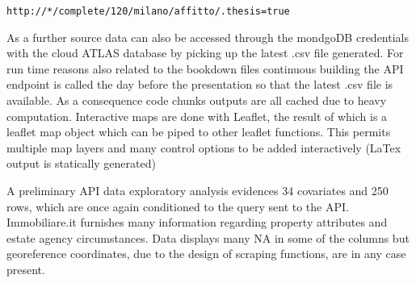 \documentclass[
  12pt,
  a4paper,
  oneside]{book}
\theoremstyle{definition}
\theoremstyle{definition}
\theoremstyle{definition}
\theoremstyle{remark}
\begin{document}
\texttt{http://*/complete/120/milano/affitto/.thesis=true}

As a further source data can also be accessed through the mondgoDB credentials with the cloud ATLAS database by picking up the latest .csv file generated. For run time reasons also related to the bookdown files continuous building the API endpoint is called the day before the presentation so that the latest .csv file is available. As a consequence code chunks outputs are all cached due to heavy computation.
Interactive maps are done with Leaflet, the result of which is a leaflet map object which can be piped to other leaflet functions. This permits multiple map layers and many control options to be added interactively (LaTex output is statically generated)

A preliminary API data exploratory analysis evidences 34 covariates and 250 rows, which are once again conditioned to the query sent to the API. Immobiliare.it furnishes many information regarding property attributes and estate agency circumstances. Data displays many NA in some of the columns but georeference coordinates, due to the design of scraping functions, are in any case present.
\end{document}
